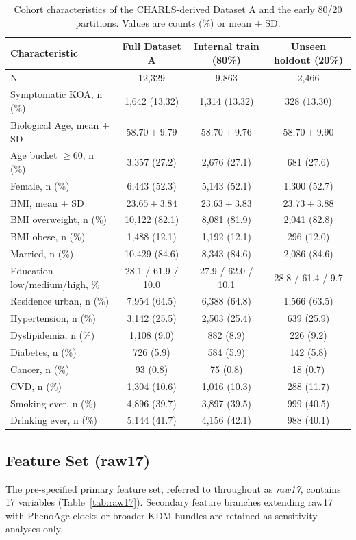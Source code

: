\documentclass[11pt,a4paper]{article}
\begin{document}
\begin{table}[h!]
\centering
\small
\caption{Cohort characteristics of the CHARLS-derived Dataset A and the early 80/20 partitions.
Values are counts (\%) or mean $\pm$ SD.}
\label{tab:table1}
\begin{tabular}{lccc}
\toprule
Characteristic & Full Dataset A & Internal train (80\%) & Unseen holdout (20\%) \\
\midrule
N & 12{,}329 & 9{,}863 & 2{,}466 \\
Symptomatic KOA, n (\%) & 1{,}642 (13.32) & 1{,}314 (13.32) & 328 (13.30) \\
Biological Age, mean $\pm$ SD & $58.70 \pm 9.79$ & $58.70 \pm 9.76$ & $58.70 \pm 9.90$ \\
Age bucket $\geq 60$, n (\%) & 3{,}357 (27.2) & 2{,}676 (27.1) & 681 (27.6) \\
Female, n (\%) & 6{,}443 (52.3) & 5{,}143 (52.1) & 1{,}300 (52.7) \\
BMI, mean $\pm$ SD & $23.65 \pm 3.84$ & $23.63 \pm 3.83$ & $23.73 \pm 3.88$ \\
BMI overweight, n (\%) & 10{,}122 (82.1) & 8{,}081 (81.9) & 2{,}041 (82.8) \\
BMI obese, n (\%) & 1{,}488 (12.1) & 1{,}192 (12.1) & 296 (12.0) \\
Married, n (\%) & 10{,}429 (84.6) & 8{,}343 (84.6) & 2{,}086 (84.6) \\
Education low/medium/high, \% & 28.1 / 61.9 / 10.0 & 27.9 / 62.0 / 10.1 & 28.8 / 61.4 / 9.7 \\
Residence urban, n (\%) & 7{,}954 (64.5) & 6{,}388 (64.8) & 1{,}566 (63.5) \\
Hypertension, n (\%) & 3{,}142 (25.5) & 2{,}503 (25.4) & 639 (25.9) \\
Dyslipidemia, n (\%) & 1{,}108 (9.0) & 882 (8.9) & 226 (9.2) \\
Diabetes, n (\%) & 726 (5.9) & 584 (5.9) & 142 (5.8) \\
Cancer, n (\%) & 93 (0.8) & 75 (0.8) & 18 (0.7) \\
CVD, n (\%) & 1{,}304 (10.6) & 1{,}016 (10.3) & 288 (11.7) \\
Smoking ever, n (\%) & 4{,}896 (39.7) & 3{,}897 (39.5) & 999 (40.5) \\
Drinking ever, n (\%) & 5{,}144 (41.7) & 4{,}156 (42.1) & 988 (40.1) \\
\bottomrule
\end{tabular}
\end{table}

\subsection{Feature Set (raw17)}
The pre-specified primary feature set, referred to throughout as \emph{raw17}, contains 17 variables
(Table~\ref{tab:raw17}). Secondary feature branches extending raw17 with PhenoAge clocks or broader
KDM bundles are retained as sensitivity analyses only.
\end{document}
